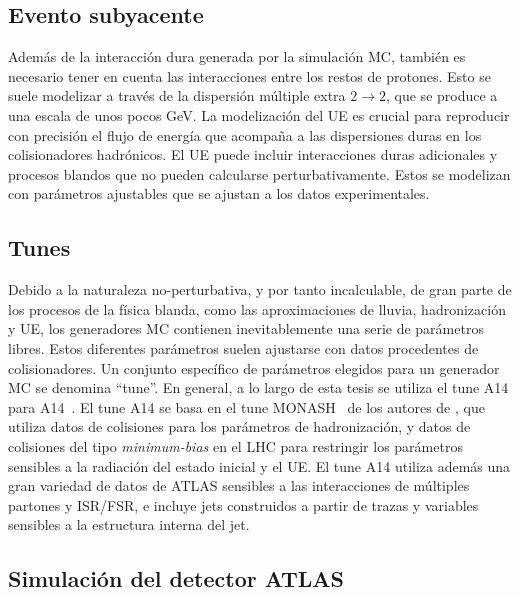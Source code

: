 \subsection{Evento subyacente}

Además de la interacción dura generada por la simulación \ac{MC}, también es necesario tener en cuenta las interacciones entre los restos de protones. Esto se suele modelizar a través de la dispersión múltiple extra \(2 \to 2\), que se produce a una escala de unos pocos GeV. La modelización del \ac{UE} es crucial para reproducir con precisión el flujo de energía que acompaña a las dispersiones duras en los colisionadores hadrónicos. El \ac{UE} puede incluir interacciones duras adicionales y procesos blandos que no pueden calcularse perturbativamente. Estos se modelizan con parámetros ajustables que se ajustan a los datos experimentales.



\subsection{Tunes}

Debido a la naturaleza no-perturbativa, y por tanto incalculable, de gran parte de los procesos de la física blanda, como las aproximaciones de lluvia, hadronización y \ac{UE}, los generadores \ac{MC} contienen inevitablemente una serie de parámetros libres. Estos diferentes parámetros suelen ajustarse con datos procedentes de colisionadores. Un conjunto específico de parámetros elegidos para un generador \ac{MC} se denomina \enquote{tune}.
En general, a lo largo de esta tesis se utiliza el tune A14 para \Pythia A14~\cite{Pythia-A14Tune}.
El tune A14 se basa en el tune MONASH~\cite{MonashTune} de los autores de \Pythia, que utiliza datos de colisiones \ee para los parámetros de hadronización, y datos de colisiones \pp del tipo \textit{minimum-bias} en el \ac{LHC} para restringir los parámetros sensibles a la radiación del estado inicial y el \ac{UE}. El tune A14 utiliza además una gran variedad de datos de \ac{ATLAS} sensibles a las interacciones de múltiples partones y \ac{ISR}/\ac{FSR}, e incluye jets construidos a partir de trazas y variables sensibles a la estructura interna del jet.


\subsection{Simulaci\'on del detector \acs{ATLAS}}

